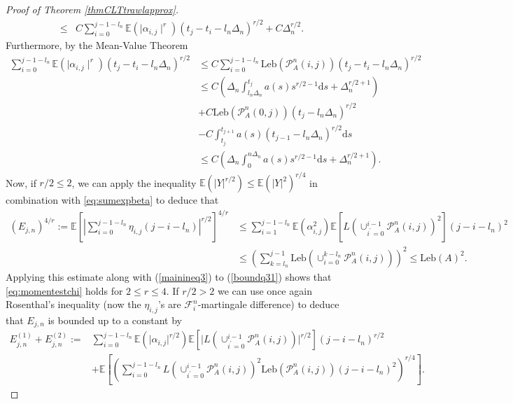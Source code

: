 \documentclass{article}
\theoremstyle{plain}
\theoremstyle{definition}
\theoremstyle{remark}
\begin{document}
\begin{appendix}
\begin{proof}[Proof of Theorem  \ref{thmCLTtrawlapprox}]
\begin{align*}
		\leq & C\sum_{i=0}^{j-1-l_n}\mathbb{E}(\mid\alpha_{i,j}\mid^{r})(t_{j}-t_{i}-l_n\Delta_n)^{r/2}+C\Delta_{n}^{r/2}.
	\end{align*}
	Furthermore, by the Mean-Value Theorem
	\begin{equation}
		\begin{aligned}\sum_{i=0}^{j-1-l_n}\mathbb{E}(\mid\alpha_{i,j}\mid^{r})(t_{j}-t_{i}-l_n\Delta_n)^{r/2} &\leq C\sum_{i=0}^{j-1-l_n}\mathrm{Leb}(\mathcal{P}_{A}^{n}(i,j))(t_{j}-t_{i}-l_n\Delta_n)^{r/2}\\
			& \leq C(\Delta_{n}\int_{l_n\Delta_n}^{t_{j}}a(s)s^{r/2-1}\mathrm{d}s+\Delta_{n}^{r/2+1})\\
			& +C\mathrm{Leb}(\mathcal{P}_{A}^{n}(0,j))(t_{j}-l_n\Delta_n)^{r/2}\\
			& -C\int_{t_{j}}^{t_{j+1}}a(s)(t_{j-1}-l_n\Delta_n)^{r/2}\mathrm{d}s\\
			& \leq C(\Delta_{n}\int_{0}^{n\Delta_{n}}a(s)s^{r/2-1}\mathrm{d}s+\Delta_{n}^{r/2+1}).
		\end{aligned}
		\label{boundq31}
	\end{equation}
	Now, if $r/2\leq2$, we can apply the inequality $\mathbb{E}(\rvert Y\rvert^{r/2})\leq\mathbb{E}(\rvert Y\rvert^{2})^{r/4}$ in combination with  \eqref{eq:sumexpbeta} to deduce that
	\begin{align*}		(E_{j,n})^{4/r}:=\mathbb{E}\left[\left|\sum_{i=0}^{j-1-l_n}\eta_{i,j}(j-i-l_n)\right|^{r/2}\right]^{4/r} & \leq\sum_{i=1}^{j-1-l_{n}}\mathbb{E}(\alpha_{i,j}^{2})\mathbb{E}[L(\cup_{i^{\prime}=0}^{i-1}\mathcal{P}_{A}^{n}(i,j))^{2}](j-i-l_n)^{2}\\
		& \leq\left(\sum_{k=l_n}^{j-1}\mathrm{Leb}(\cup_{i=0}^{k-l_n}\mathcal{P}_{A}^{n}(i,j))\right)^{2}\leq\mathrm{Leb}(A)^{2}.
	\end{align*}
	Applying this estimate along with (\ref{mainineq3}) to (\ref{boundq31}) 
	shows that \eqref{eq:momentestchi} holds for $2\leq r\leq 4$. If
	$r/2>2$ we can use once again Rosenthal's inequality (now the $\eta_{i,j}$'s
	are $\mathscr{F}_{i}^{n}$-martingale difference) to deduce that  $E_{j,n}$ is bounded up to a constant by 
	\begin{align*}
		E^{(1)}_{j,n}+ E^{(2)}_{j,n}:=& \sum_{i=0}^{j-1-l_n}\mathbb{E}(\rvert\alpha_{i,j}\rvert^{r/2})\mathbb{E}[\rvert L(\cup_{i^{\prime}=0}^{i-1}\mathcal{P}_{A}^{n}(i,j))\rvert^{r/2}](j-i-l_n)^{r/2}\\
		& +\mathbb{E}\left[\left(\sum_{i=0}^{j-1-l_n}L(\cup_{i^{\prime}=0}^{i-1}\mathcal{P}_{A}^{n}(i,j))^{2}\mathrm{Leb}(\mathcal{P}_{A}^{n}(i,j))(j-i-l_n)^{2}\right)^{r/4}\right].

\end{align*}
\end{proof}
\end{appendix}
\end{document}
